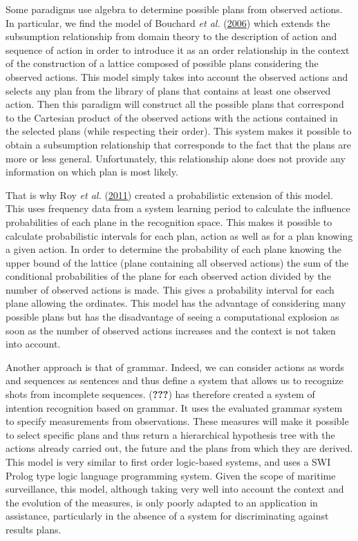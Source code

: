\documentclass[11pt,a4paper,twoside,openright,titlepage,numbers=noenddot,headinclude,cleardoublepage=empty,openany]{scrreprt}
\theoremstyle{plain}
\theoremstyle{definition}
\theoremstyle{remark}
\begin{document}
Some paradigms use algebra to determine possible plans from observed
actions. In particular, we find the model of Bouchard \emph{et al.}
(\protect\hyperlink{ref-bouchard_smart_2006}{2006}) which extends the
subsumption relationship from domain theory to the description of action
and sequence of action in order to introduce it as an order relationship
in the context of the construction of a lattice composed of possible
plans considering the observed actions. This model simply takes into
account the observed actions and selects any plan from the library of
plans that contains at least one observed action. Then this paradigm
will construct all the possible plans that correspond to the Cartesian
product of the observed actions with the actions contained in the
selected plans (while respecting their order). This system makes it
possible to obtain a subsumption relationship that corresponds to the
fact that the plans are more or less general. Unfortunately, this
relationship alone does not provide any information on which plan is
most likely.

That is why Roy \emph{et al.}
(\protect\hyperlink{ref-roy_possibilistic_2011}{2011}) created a
probabilistic extension of this model. This uses frequency data from a
system learning period to calculate the influence probabilities of each
plane in the recognition space. This makes it possible to calculate
probabilistic intervals for each plan, action as well as for a plan
knowing a given action. In order to determine the probability of each
plane knowing the upper bound of the lattice (plane containing all
observed actions) the sum of the conditional probabilities of the plane
for each observed action divided by the number of observed actions is
made. This gives a probability interval for each plane allowing the
ordinates. This model has the advantage of considering many possible
plans but has the disadvantage of seeing a computational explosion as
soon as the number of observed actions increases and the context is not
taken into account.

Another approach is that of grammar. Indeed, we can consider actions as
words and sequences as sentences and thus define a system that allows us
to recognize shots from incomplete sequences. ({\textbf{???}}) has
therefore created a system of intention recognition based on grammar. It
uses the evaluated grammar system to specify measurements from
observations. These measures will make it possible to select specific
plans and thus return a hierarchical hypothesis tree with the actions
already carried out, the future and the plans from which they are
derived. This model is very similar to first order logic-based systems,
and uses a SWI Prolog type logic language programming system. Given the
scope of maritime surveillance, this model, although taking very well
into account the context and the evolution of the measures, is only
poorly adapted to an application in assistance, particularly in the
absence of a system for discriminating against results plans.
\end{document}
